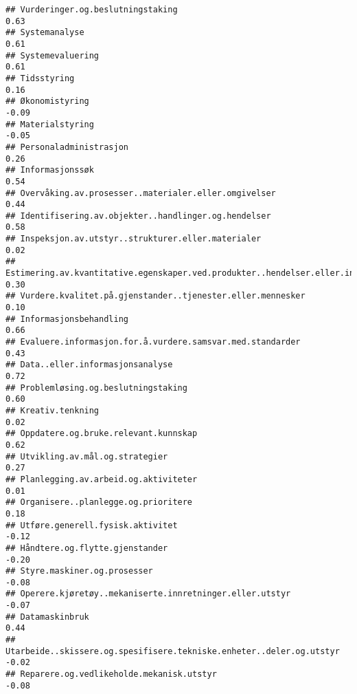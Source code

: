 \documentclass[
]{article}
\begin{document}
\begin{verbatim}
## Vurderinger.og.beslutningstaking                                                  0.63
## Systemanalyse                                                                     0.61
## Systemevaluering                                                                  0.61
## Tidsstyring                                                                       0.16
## Økonomistyring                                                                   -0.09
## Materialstyring                                                                  -0.05
## Personaladministrasjon                                                            0.26
## Informasjonssøk                                                                   0.54
## Overvåking.av.prosesser..materialer.eller.omgivelser                              0.44
## Identifisering.av.objekter..handlinger.og.hendelser                               0.58
## Inspeksjon.av.utstyr..strukturer.eller.materialer                                 0.02
## Estimering.av.kvantitative.egenskaper.ved.produkter..hendelser.eller.informasjon  0.30
## Vurdere.kvalitet.på.gjenstander..tjenester.eller.mennesker                        0.10
## Informasjonsbehandling                                                            0.66
## Evaluere.informasjon.for.å.vurdere.samsvar.med.standarder                         0.43
## Data..eller.informasjonsanalyse                                                   0.72
## Problemløsing.og.beslutningstaking                                                0.60
## Kreativ.tenkning                                                                  0.02
## Oppdatere.og.bruke.relevant.kunnskap                                              0.62
## Utvikling.av.mål.og.strategier                                                    0.27
## Planlegging.av.arbeid.og.aktiviteter                                              0.01
## Organisere..planlegge.og.prioritere                                               0.18
## Utføre.generell.fysisk.aktivitet                                                 -0.12
## Håndtere.og.flytte.gjenstander                                                   -0.20
## Styre.maskiner.og.prosesser                                                      -0.08
## Operere.kjøretøy..mekaniserte.innretninger.eller.utstyr                          -0.07
## Datamaskinbruk                                                                    0.44
## Utarbeide..skissere.og.spesifisere.tekniske.enheter..deler.og.utstyr             -0.02
## Reparere.og.vedlikeholde.mekanisk.utstyr                                         -0.08

\end{verbatim}
\end{document}
